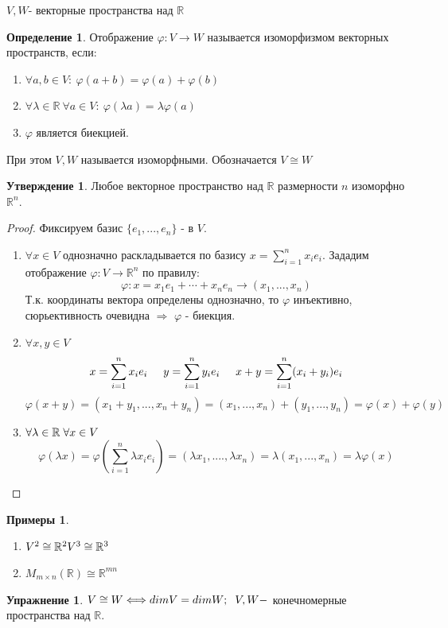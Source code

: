 \documentclass[a4paper, 12pt]{article}
\newcommand{\R}{\mathbb R}
\renewcommand{\phi}{\varphi}
\newcommand\tab[1][.5cm]{\hspace*{#1}}
\theoremstyle{definition}
\newtheorem*{definition}{Определение}
\newtheorem*{subtheorem}{Утверждение}
\newtheorem*{example}{Примеры}
\newtheorem*{lalala}{Упражнение}
\begin{document}
  $V, W$- векторные пространства над $\R$ 
  \begin{definition}
    Отображение $\phi: V \to W$ называется изоморфизмом векторных пространств, если:
    \begin{enumerate}
      \item $\forall a, b \in V: \ \phi(a+b) = \phi(a) + \phi(b)$
      \item $\forall \lambda \in \R \ \forall a \in V: \ \phi(\lambda a) = \lambda \phi(a)$
      \item $\phi$ является биекцией. 
    \end{enumerate}
    При этом $V, W$ называется изоморфными. Обозначается $V \cong W$ 
  \end{definition} 
  \begin{subtheorem}
    Любое векторное  пространство над $\R$ размерности $n$ изоморфно $\R^n$. 
  \end{subtheorem} 
  \begin{proof}
    Фиксируем базис $\{e_1,...,e_n\}$ - в $V$.
    \begin{enumerate}
      \item $\forall x \in V$ однозначно раскладывается по базису $x = \sum \limits_{i=1}^{n} x_ie_i$. 
    Зададим отображение  $\phi: V \to \R^n$ по правилу:
    $$\phi: x = x_1e_1 + \cdots + x_ne_n \to (x_1,...,x_n)$$
    Т.к. координаты вектора определены однозначно, то $\phi$ инъективно, сюрьективность очевидна $\Longrightarrow $ $\phi$ - биекция.
    \item $\forall x,y \in V$
    $$x = \sum \limits_{i=1}^{n} x_ie_i \tab[0.5cm] y = \sum \limits_{i=1}^{n} y_ie_i \tab[0.5cm]
    x + y = \sum \limits_{i=1}^{n} (x_i + y_i)e_i$$ 
    $$\phi(x+y) = (x_1 + y_1,...,x_n+y_n) = (x_1,...,x_n) + (y_1,...,y_n) = \phi(x) + \phi(y)$$ 
    \item $\forall \lambda \in \R \tab[0.1cm] \forall x \in V$
    $$\phi(\lambda x) = \phi(\sum \limits_{i=1}^{n} \lambda x_ie_i) = (\lambda x_1,....,\lambda x_n) = \lambda (x_1,...,x_n) = \lambda \phi(x)$$  
    \end{enumerate}
  \end{proof} 

  \begin{example}\end{example}
  \begin{enumerate}
    \item $V^2 \cong \R^2 \\ V^3 \cong \R^3$ 
    \item $M_{m \times n}(\R) \cong \R^{mn}$
  \end{enumerate}
  \begin{lalala}
    $V \cong W \Longleftrightarrow dimV = dimW; \tab[0.2cm] V,W - $ конечномерные пространства над $\R$.  
  \end{lalala}
\end{document}
